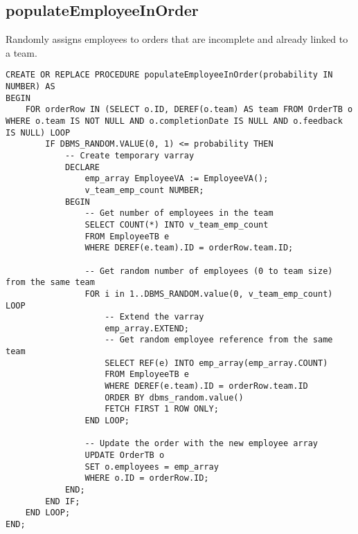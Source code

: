 \subsection*{populateEmployeeInOrder}
Randomly assigns employees to orders that are incomplete and already linked to a team.
\begin{lstlisting}
CREATE OR REPLACE PROCEDURE populateEmployeeInOrder(probability IN NUMBER) AS
BEGIN
    FOR orderRow IN (SELECT o.ID, DEREF(o.team) AS team FROM OrderTB o WHERE o.team IS NOT NULL AND o.completionDate IS NULL AND o.feedback IS NULL) LOOP
        IF DBMS_RANDOM.VALUE(0, 1) <= probability THEN
            -- Create temporary varray
            DECLARE
                emp_array EmployeeVA := EmployeeVA();
                v_team_emp_count NUMBER;
            BEGIN
                -- Get number of employees in the team
                SELECT COUNT(*) INTO v_team_emp_count
                FROM EmployeeTB e 
                WHERE DEREF(e.team).ID = orderRow.team.ID;

                -- Get random number of employees (0 to team size) from the same team
                FOR i in 1..DBMS_RANDOM.value(0, v_team_emp_count) LOOP
                    -- Extend the varray
                    emp_array.EXTEND;
                    -- Get random employee reference from the same team
                    SELECT REF(e) INTO emp_array(emp_array.COUNT)
                    FROM EmployeeTB e
                    WHERE DEREF(e.team).ID = orderRow.team.ID
                    ORDER BY dbms_random.value()
                    FETCH FIRST 1 ROW ONLY;
                END LOOP;

                -- Update the order with the new employee array
                UPDATE OrderTB o
                SET o.employees = emp_array
                WHERE o.ID = orderRow.ID;
            END;
        END IF;
    END LOOP;
END;
\end{lstlisting}

